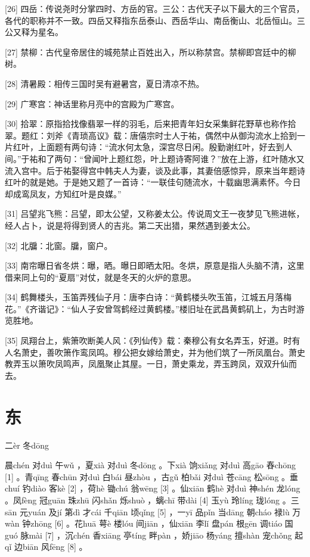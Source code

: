 \documentclass[12pt,UTF8]{ctexbook}
\begin{document}
[26] 四岳：传说尧时分掌四时、方岳的官。三公：古代天子以下最大的三个官员，各代的职称并不一致。四岳又释指东岳泰山、西岳华山、南岳衡山、北岳恒山。三公又释为星名。

[27] 禁柳：古代皇帝居住的城苑禁止百姓出入，所以称禁宫。禁柳即宫廷中的柳树。

[28] 清暑殿：相传三国时吴有避暑宫，夏日清凉不热。

[29] 广寒宫：神话里称月亮中的宫殿为广寒宫。

[30] 拾翠：原指拾找像翡翠一样的羽毛，后来把青年妇女采集鲜花野草也称作拾翠。题红：刘斧《青琐高议》载：唐僖宗时士人于祐，偶然中从御沟流水上拾到一片红叶，上面题有两句诗：“流水何太急，深宫尽日闲。殷勤谢红叶，好去到人间。”于祐和了两句：“曾闻叶上题红怨，叶上题诗寄阿谁？”放在上游，红叶随水又流入宫中。后于祐娶得宫中韩夫人为妻，谈及此事，其妻倍感惊异，原来当年题诗红叶的就是她。于是她又题了一首诗：“一联佳句随流水，十载幽思满素怀。今日却成鸾凤友，方知红叶是良媒。”

[31] 吕望兆飞熊：吕望，即太公望，又称姜太公。传说周文王一夜梦见飞熊进帐，经人占卜，说是将得到贤人的吉兆。第二天出猎，果然遇到姜太公。

[32] 北牖：北窗。牖，窗户。

[33] 南帘曝日省冬烘：曝，晒。曝日即晒太阳。冬烘，原意是指人头脑不清，这里借来同上句的“夏扇”对仗，就是冬天的火炉的意思。

[34] 鹤舞楼头，玉笛弄残仙子月：唐李白诗：“黄鹤楼头吹玉笛，江城五月落梅花。”《齐谐记》：“仙人子安曾驾鹤经过黄鹤楼。”楼旧址在武昌黄鹤矶上，为古时游览胜地。

[35] 凤翔台上，紫箫吹断美人风：《列仙传》载：秦穆公有女名弄玉，好道。时有人名萧史，善吹箫作鸾凤鸣。穆公把女嫁给萧史，并为他们筑了一所凤凰台。萧史教弄玉以箫吹凤鸣声，凤凰聚止其屋。一日，萧史乘龙，弄玉跨凤，双双升仙而去。




\chapter{东}
二èr 冬dōng


晨chén 对duì 午wǔ ，夏xià 对duì 冬dōng 。下xià 饷xiǎng 对duì 高gāo 舂chōng [1] 。青qīng 春chūn 对duì 白bái 昼zhòu ，古gǔ 柏bǎi 对duì 苍cāng 松sōng 。垂chuí 钓diào 客kè [2] ，荷hè 锄chú 翁wēng [3] 。仙xiān 鹤hè 对duì 神shén 龙lóng 。凤fèng 冠guān 珠zhū 闪shǎn 烁shuò ，螭chī 带dài [4] 玉yù 玲líng 珑lóng 。三sān 元yuán 及jí 第dì 才cái 千qiān 顷qǐng [5] ，一yī 品pǐn 当dāng 朝cháo 禄lù 万wàn 钟zhōng [6] 。花huā 萼è 楼lóu 间jiān ，仙xiān 李lǐ 盘pán 根gēn 调tiáo 国guó 脉mài [7] ，沉chén 香xiāng 亭tíng 畔pàn ，娇jiāo 杨yáng 擅shàn 宠chǒng 起qǐ 边biān 风fēng [8] 。
\end{document}
